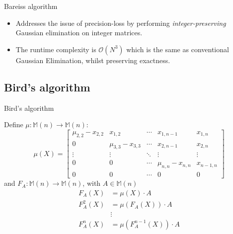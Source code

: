 \documentclass{beamer}
\begin{document}
\begin{frame}{Bareiss algorithm}

    \begin{itemize}

        \item Addresses the issue of precision-loss by performing \emph{integer-preserving}
            Gaussian elimination on integer matrices.

        \item The runtime complexity is $\mathcal{O}(N^3)$ which is the same as conventional
            Gaussian Elimination, whilst preserving exactness.


    \end{itemize}


\end{frame}

\subsection{Bird's algorithm}

\begin{frame}{Bird's algorithm}

    Define $\mu : \mathbb{M}(n) \to \mathbb{M}(n)$:
    \[
        \mu(X) =
        \begin{bmatrix}{}
            \mu_{2,2} - x_{2,2} & x_{1,2}             & \cdots & x_{1,n-1}           & x_{1,n} \\
            0                   & \mu_{3,3} - x_{3,3} & \cdots & x_{2,n-1}           & x_{2,n} \\
            \vdots              & \vdots              & \ddots & \vdots              & \vdots \\
            0                   & 0                   & \cdots & \mu_{n,n} - x_{n,n} & x_{n-1,n} \\
            0                   & 0                   & \cdots & 0                   & 0
        \end{bmatrix}
    \]
    and $F_A : \mathbb{M}(n) \to \mathbb{M}(n)$,
    with $A \in \mathbb{M}(n)$
    \begin{align*}{}
        F_A(X)    & = \mu(X)\cdot A \\
        F_A^2(X)  & = \mu(F_A(X)) \cdot A \\
                  & \vdots \\
        F_A^n(X)  & = \mu(F_A^{n-1}(X)) \cdot A \\
    \end{align*}

\end{frame}
\end{document}
